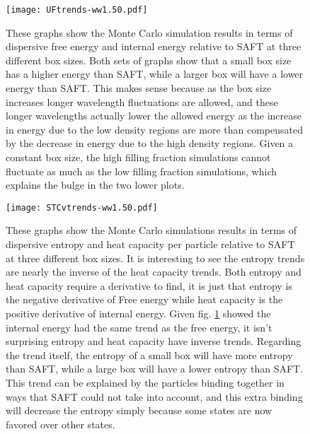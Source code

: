 \begin{figure}[h]
\vspace*{-10mm}
\hspace*{-6mm}
	\centering
	\texttt{[image: UFtrends-ww1.50.pdf]}
	\caption{
	\scriptsize
	These graphs show the Monte Carlo simulation results in terms of dispersive free energy and internal energy relative to SAFT at three different box sizes. Both sets of graphs show that a small box size has a higher energy than SAFT, while a larger box will have a lower energy than SAFT. This makes sense because as the box size increases longer wavelength fluctuations are allowed, and these longer wavelengths actually lower the allowed energy as the increase in energy due to the low density regions are more than compensated by the decrease in energy due to the high density regions. Given a constant box size, the high filling fraction simulations cannot fluctuate as much as the low filling fraction simulations, which explains the bulge in the two lower plots.}
	\label{fig:UFtrends}
\end{figure}


\pagebreak
\begin{figure}[h]
\vspace*{-7mm}
\hspace*{-6mm}
	\centering
	\texttt{[image: STCvtrends-ww1.50.pdf]}
	\caption{\scriptsize
	These graphs show the Monte Carlo simulations results in terms of dispersive entropy and heat capacity per particle relative to SAFT at three different box sizes. It is interesting to see the entropy trends are nearly the inverse of the heat capacity trends. Both entropy and heat capacity require a derivative to find, it is just that entropy is the negative derivative of Free energy while heat capacity is the positive derivative of internal energy. Given fig. \ref{fig:UFtrends} showed the internal energy had the same trend as the free energy, it isn't surprising entropy and heat capacity have inverse trends. Regarding the trend itself, the entropy of a small box will have more entropy than SAFT, while a large box will have a lower entropy than SAFT. This trend can be explained by the particles binding together in ways that SAFT could not take into account, and this extra binding will decrease the entropy simply because some states are now favored over other states.}
	\label{fig:STCvtrends}
\end{figure}


